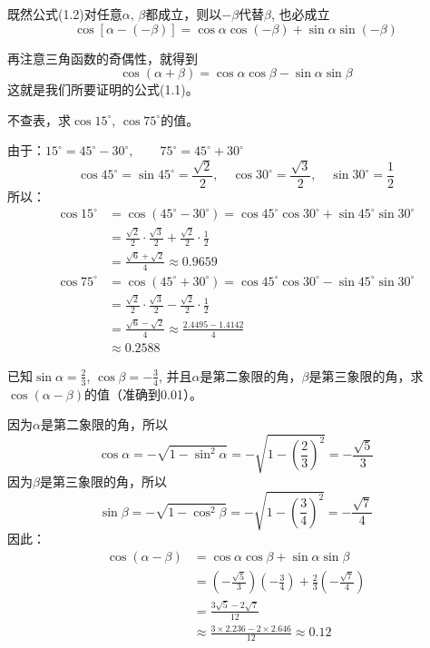 既然公式(1.2)对任意$\alpha$, $\beta$都成立，则以$-\beta$代替$\beta$, 也必成立
    \[ \cos [\alpha-(-\beta)] =\cos\alpha\cos(-\beta)+\sin\alpha\sin(-\beta)\]

再注意三角函数的奇偶性，就得到
\[ \cos(\alpha+\beta) =\cos\alpha\cos\beta-\sin\alpha\sin\beta\]
这就是我们所要证明的公式(1.1)。

\begin{example}
不查表，求$\cos15^{\circ}$, $\cos75^{\circ}$的值。
\end{example}

\begin{solution}
由于：$15^{\circ}=45^{\circ}-30^{\circ},\qquad 75^{\circ}=45^{\circ}+30^{\circ}$
\[\cos 45^{\circ}=\sin 45^{\circ}=\frac{\sqrt{2}}{2},\quad \cos 30^{\circ}=\frac{\sqrt{3}}{2},\quad \sin 30^{\circ}=\frac{1}{2} \]
所以：
\[\begin{split}
\cos15^{\circ}&=\cos(45^{\circ}-30^{\circ})=\cos 45^{\circ}\cos30^{\circ}+\sin 45^{\circ}\sin30^{\circ}\\
&=\frac{\sqrt{2}}{2}\cdot \frac{\sqrt{3}}{2}+\frac{\sqrt{2}}{2}\cdot \frac{1}{2}\\
&=\frac{\sqrt{6}+\sqrt{2}}{4}\approx 0.9659 
\end{split}\]
\[\begin{split}
\cos75^{\circ}&=\cos(45^{\circ}+30^{\circ})=\cos 45^{\circ}\cos30^{\circ}-\sin 45^{\circ}\sin30^{\circ}\\
&=\frac{\sqrt{2}}{2}\cdot \frac{\sqrt{3}}{2}-\frac{\sqrt{2}}{2}\cdot \frac{1}{2}\\
&=\frac{\sqrt{6}-\sqrt{2}}{4}\approx \frac{2.4495-1.4142}{4}\\
&\approx 0.2588 
\end{split}\]
\end{solution}

\begin{example}
    已知$\sin\alpha=\frac{2}{3}$, $\cos\beta=-\frac{3}{4}$, 并且$\alpha$是第二象限的角，$\beta$是第三象限的角，求$\cos(\alpha-\beta)$的值（准确到0.01）。
\end{example}

\begin{solution}
因为$\alpha$是第二象限的角，所以
\[\cos\alpha=-\sqrt{1-\sin^2\alpha}=-\sqrt{1-\left(\frac{2}{3}\right)^2}=-\frac{\sqrt{5}}{3}\]
因为$\beta$是第三象限的角，所以
\[\sin\beta=-\sqrt{1-\cos^2\beta}=-\sqrt{1-\left(\frac{3}{4}\right)^2}=-\frac{\sqrt{7}}{4}\]
因此：
\[\begin{split}
    \cos (\alpha-\beta) &=\cos\alpha\cos\beta+\sin\alpha\sin\beta\\
    &=\left(-\frac{\sqrt{5}}{3}\right)\left(-\frac{3}{4}\right)+\frac{2}{3}\left(-\frac{\sqrt{7}}{4}\right)\\
    &=\frac{3\sqrt{5}-2\sqrt{7}}{12}\\
    &\approx \frac{3\times2.236-2\times 2.646}{12}\approx 0.12
\end{split}\]
\end{solution}


